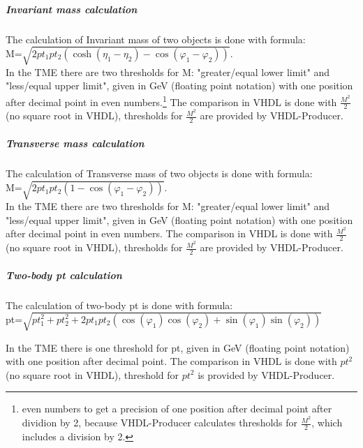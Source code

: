 \subparagraph{Invariant mass calculation}
\label{sec:gtl:inv_mass_calculation}

The calculation of Invariant mass of two objects is done with formula:\\
M=$\sqrt{2 pt_1  pt_2 (\cosh(\eta_1-\eta_2)-\cos(\varphi_1-\varphi_2))}$.\\
In the TME there are two thresholds for M: "greater/equal lower limit" and "less/equal upper limit", given in GeV (floating point notation)
with one position after decimal point in even numbers.\footnote{even numbers to get a precision of one position after decimal point after dividion by 2,
because VHDL-Producer calculates thresholds for $\frac{M^2}{2}$, which includes a division by 2.}
The comparison in VHDL is done with $\frac{M^2}{2}$ (no square root in VHDL), thresholds for $\frac{M^2}{2}$ are provided by VHDL-Producer.

\subparagraph{Transverse mass calculation}
\label{sec:gtl:transverse_mass_calculation}

The calculation of Transverse mass of two objects is done with formula:\\
M=$\sqrt{2 pt_1 pt_2 (1-\cos(\varphi_1-\varphi_2))}$.\\
In the TME there are two thresholds for M: "greater/equal lower limit" and "less/equal upper limit", given in GeV (floating point notation)
with one position after decimal point in even numbers.
The comparison in VHDL is done with $\frac{M^2}{2}$ (no square root in VHDL), thresholds for $\frac{M^2}{2}$ are provided by VHDL-Producer.

\subparagraph{Two-body pt calculation}
\label{sec:gtl:twobody_pt_calculation}

The calculation of two-body pt is done with formula:\\
pt=$\sqrt{pt^2_1 + pt^2_2 + 2  pt_1 pt_2 (\cos(\varphi_1) \cos(\varphi_2) + \sin(\varphi_1) \sin(\varphi_2))}$

In the TME there is one threshold for pt, given in GeV (floating point notation) with one position after decimal point.
The comparison in VHDL is done with ${pt^2}$ (no square root in VHDL), threshold for ${pt^2}$ is provided by VHDL-Producer.

